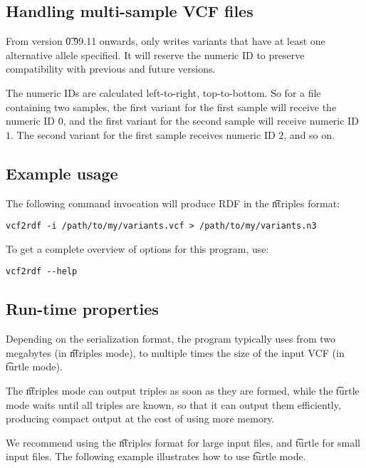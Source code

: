 \subsection{Handling multi-sample VCF files}

  From version \t{0.99.11} onwards,  only writes variants
  that have at least one alternative allele specified.  It will reserve the
  numeric ID to preserve compatibility with previous and future versions.

  The numeric IDs are calculated left-to-right, top-to-bottom.  So for a file
  containing two samples, the first variant for the first sample will receive
  the numeric ID $0$, and the first variant for the second sample will receive
  numeric ID $1$.  The second variant for the first sample receives numeric ID
  $2$, and so on.

\subsection{Example usage}

The following command invocation will produce RDF in the \t{ntriples}
format:

\begin{lstlisting}
vcf2rdf -i /path/to/my/variants.vcf > /path/to/my/variants.n3
\end{lstlisting}

To get a complete overview of options for this program, use:

\begin{lstlisting}
vcf2rdf --help
\end{lstlisting}

\subsection{Run-time properties}

  Depending on the serialization format, the program typically uses from two megabytes
  (in \t{ntriples} mode), to multiple times the size of the input VCF
  (in \t{turtle} mode).

  The \t{ntriples} mode can output triples as soon as they are formed, while the
  \t{turtle} mode waits until all triples are known, so that it can output them
  efficiently, producing compact output at the cost of using more memory.

  We recommend using the \t{ntriples} format for large input files, and
  \t{turtle} for small input files.  The following example illustrates how to
  use \t{turtle} mode.

